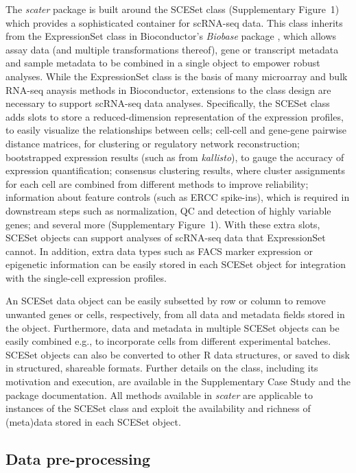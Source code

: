 \documentclass{bioinfo}
\begin{document}
The \emph{scater} package is built around the SCESet class (Supplementary Figure~1) which provides a sophisticated container for scRNA-seq data. This class inherits from the ExpressionSet class in Bioconductor's \emph{Biobase} package \citep{Huber2015-en}, which allows assay data (and multiple transformations thereof), gene or transcript metadata and sample metadata to be combined in a single object to empower robust analyses. While the ExpressionSet class is the basis of many microarray and bulk RNA-seq anaysis methods in Bioconductor, extensions to the class design are necessary to support scRNA-seq data analyses. Specifically, the SCESet class adds slots to store a reduced-dimension representation of the expression profiles, to easily visualize the relationships between cells; cell-cell and gene-gene pairwise distance matrices, for clustering or regulatory network reconstruction; bootstrapped expression results (such as from \emph{kallisto}), to gauge the accuracy of expression quantification; consensus clustering results, where cluster assignments for each cell are combined from different methods to improve reliability; information about feature controls (such as ERCC spike-ins), which is required in downstream steps such as normalization, QC and detection of highly variable genes; and several more (Supplementary Figure~1). With these extra slots, SCESet objects can support analyses of scRNA-seq data that ExpressionSet cannot. In addition, extra data types such as FACS marker expression or epigenetic information can be easily stored in each SCESet object for integration with the single-cell expression profiles.

An SCESet data object can be easily subsetted by row or column to remove unwanted genes or cells, respectively, from all data and metadata fields stored in the object. Furthermore, data and metadata in multiple SCESet objects can be easily combined e.g., to incorporate cells from different experimental batches. SCESet objects can also be converted to other R data structures, or saved to disk in structured, shareable formats. Further details on the class, including its motivation and execution, are available in the Supplementary Case Study and the package documentation. All methods available in \emph{scater} are applicable to instances of the SCESet class and exploit the availability and richness of (meta)data stored in each SCESet object.


\subsection{Data pre-processing}\label{data-pre-processing}
\end{document}
